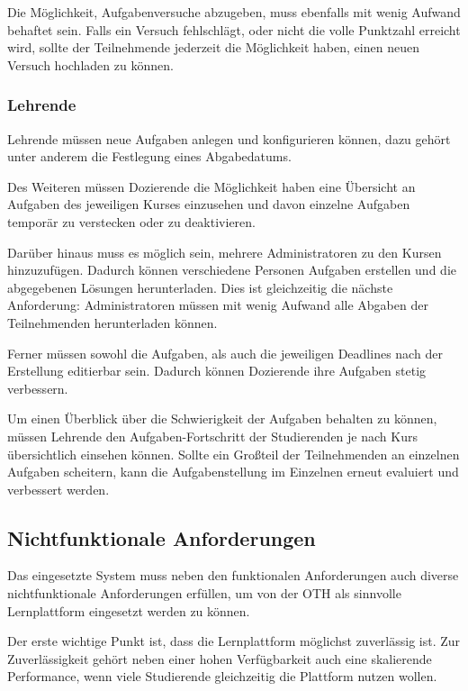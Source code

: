 Die Möglichkeit, Aufgabenversuche abzugeben, muss ebenfalls mit wenig Aufwand
behaftet sein. Falls ein Versuch fehlschlägt, oder nicht die volle Punktzahl
erreicht wird, sollte der Teilnehmende jederzeit die Möglichkeit haben, einen
neuen Versuch hochladen zu können.

\subsubsection{Lehrende}\label{anforderungsanalyse-funktional-lehrende}
Lehrende müssen neue Aufgaben anlegen und konfigurieren können, dazu gehört
unter anderem die Festlegung eines Abgabedatums.

Des Weiteren müssen Dozierende die Möglichkeit haben eine Übersicht an Aufgaben
des jeweiligen Kurses einzusehen und davon einzelne Aufgaben temporär zu
verstecken oder zu deaktivieren.

Darüber hinaus muss es möglich sein, mehrere Administratoren zu den Kursen
hinzuzufügen. Dadurch können verschiedene Personen Aufgaben erstellen und die
abgegebenen Lösungen herunterladen. Dies ist gleichzeitig die nächste
Anforderung: Administratoren müssen mit wenig Aufwand alle Abgaben der
Teilnehmenden herunterladen können.

Ferner müssen sowohl die Aufgaben, als auch die jeweiligen Deadlines nach der
Erstellung editierbar sein. Dadurch können Dozierende ihre Aufgaben stetig
verbessern.

Um einen Überblick über die Schwierigkeit der Aufgaben behalten zu können,
müssen Lehrende den Aufgaben-Fortschritt der Studierenden je nach Kurs
übersichtlich einsehen können. Sollte ein Großteil der Teilnehmenden an
einzelnen Aufgaben scheitern, kann die Aufgabenstellung im Einzelnen erneut
evaluiert und verbessert werden.

\subsection{Nichtfunktionale Anforderungen}
\label{anforderungsanalyse-nichtfunktional}
Das eingesetzte System muss neben den funktionalen Anforderungen auch diverse
nichtfunktionale Anforderungen erfüllen, um von der OTH als sinnvolle
Lernplattform eingesetzt werden zu können.

Der erste wichtige Punkt ist, dass die Lernplattform möglichst zuverlässig ist.
Zur Zuverlässigkeit gehört neben einer hohen Verfügbarkeit auch eine skalierende
Performance, wenn viele Studierende gleichzeitig die Plattform nutzen wollen.


